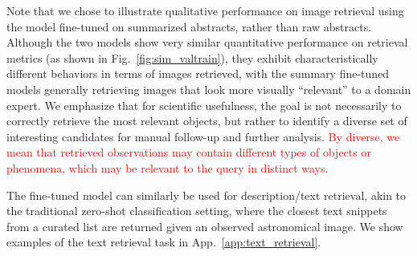 \documentclass{article} %
\newcommand{\changes}[1]{\textcolor{red}{#1}}
\begin{document}
   Note that we chose to illustrate qualitative performance on image retrieval using the model fine-tuned on summarized abstracts, rather than raw abstracts. 
   Although the two models show very similar quantitative performance on retrieval metrics (as shown in Fig.~\ref{fig:sim_valtrain}), they exhibit characteristically different behaviors in terms of images retrieved, with the summary fine-tuned models generally retrieving images that look more visually ``relevant'' to a domain expert. We emphasize that for scientific usefulness, the goal is not necessarily to correctly retrieve the most relevant objects, but rather to identify a diverse set of interesting candidates for manual follow-up and further analysis.  %
   \changes{By diverse, we mean that retrieved observations may contain different types of objects or phenomena, which may be relevant to the query in distinct ways.}

  The fine-tuned model can similarly be used for description/text retrieval, akin to the traditional zero-shot classification setting, where the closest text snippets from a curated list are returned given an observed astronomical image. We show examples of the text retrieval task in App.~\ref{app:text_retrieval}.
\end{document}
